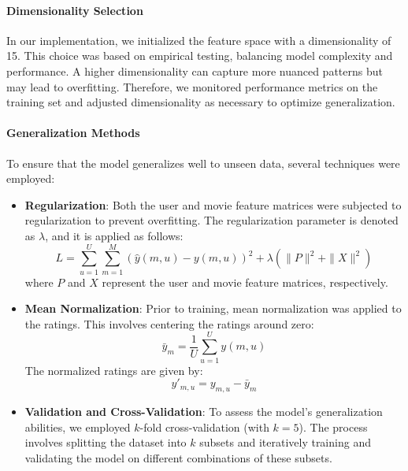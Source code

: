 \documentclass[a4paper,9pt]{article}
\begin{document}
\paragraph{Dimensionality Selection}
In our implementation, we initialized the feature space with a dimensionality of 15. This choice was based on empirical testing, balancing model complexity and performance. A higher dimensionality can capture more nuanced patterns but may lead to overfitting. Therefore, we monitored performance metrics on the training set and adjusted dimensionality as necessary to optimize generalization.

\paragraph{Generalization Methods}
To ensure that the model generalizes well to unseen data, several techniques were employed:

\begin{itemize}
	\item \textbf{Regularization}: Both the user and movie feature matrices were subjected to regularization to prevent overfitting. The regularization parameter is denoted as \( \lambda \), and it is applied as follows:
	      \begin{equation}
		      L = \sum_{u=1}^{U} \sum_{m=1}^{M} \left( \hat{y}(m,u) - y(m,u) \right)^2 + \lambda \left( \|P\|^2 + \|X\|^2 \right) \tag{1}
	      \end{equation}
	      where \(P\) and \(X\) represent the user and movie feature matrices, respectively.

	\item \textbf{Mean Normalization}: Prior to training, mean normalization was applied to the ratings. This involves centering the ratings around zero:
	      \begin{equation}
		      \bar{y}_m = \frac{1}{U} \sum_{u=1}^{U} y(m,u) \tag{2}
	      \end{equation}
	      The normalized ratings are given by:
	      \begin{equation}
		      y'_{m,u} = y_{m,u} - \bar{y}_m \tag{3}
	      \end{equation}

	\item \textbf{Validation and Cross-Validation}: To assess the model’s generalization abilities, we employed \( k \)-fold cross-validation (with \( k = 5 \)). The process involves splitting the dataset into \( k \) subsets and iteratively training and validating the model on different combinations of these subsets.
\end{itemize}
\end{document}
